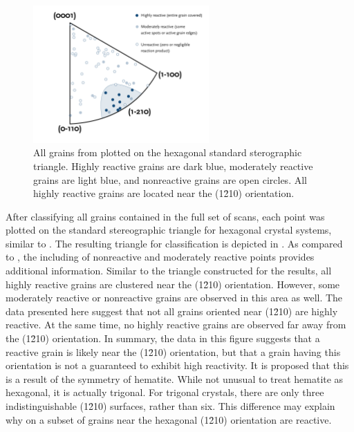 \begin{figure}
	\centerline{\includegraphics[width=0.6\textwidth]{afmtriangle.pdf}}
		\caption[Reactive grains from ]{%
			All grains from  plotted on the 
			hexagonal standard sterographic triangle. Highly reactive grains 
			are dark blue, moderately reactive grains are light blue, and 
			nonreactive grains are open circles. All highly reactive grains 
			are located near the (1\={2}10) orientation.}
	\label{fig:afmtriangle}	
\end{figure}
After classifying all grains contained in the full set of  scans, each point was
plotted on the standard stereographic triangle for hexagonal crystal systems, similar to
. The resulting triangle for  classification is depicted
in . As compared to , the including of
nonreactive and moderately reactive points provides additional information. Similar to the
triangle constructed for the  results, all highly reactive grains are clustered
near the (1\={2}10) orientation. However, some moderately reactive or nonreactive grains
are observed in this area as well. The data presented here suggest that not all grains
oriented near (1\={2}10) are highly reactive. At the same time, no highly reactive grains
are observed far away from the (1\={2}10) orientation. In summary, the data in this figure
suggests that a reactive grain is likely near the (1\={2}10) orientation, but that a grain
having this orientation is not a guaranteed to exhibit high reactivity. It is proposed
that this is a result of the symmetry of hematite. While not unusual to treat hematite as
hexagonal, it is actually trigonal. For trigonal crystals, there are only three
indistinguishable (1\={2}10) surfaces, rather than six. This difference may explain why on
a subset of grains near the hexagonal (1\={2}10) orientation are reactive.


